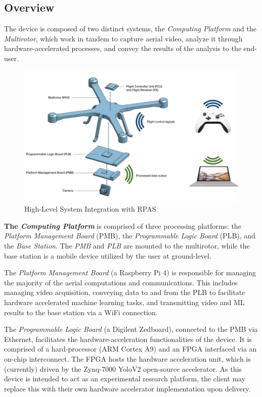 \subsection{Overview}
The device is composed of two distinct systems, the \textit{Computing Platform} and the \textit{Multirotor}, which work in tandem to capture aerial video, analyze it through hardware-accelerated processes, and convey the results of the analysis to the end-user. 

\begin{figure}[H]\label{hlpic}
    \centering
    \includegraphics[width=\linewidth]{img/intpic.png}
\caption{High-Level System Integration with RPAS}
\end{figure}

\textbf{The \textit{Computing Platform}} is comprised of three processing platforms: the \textit{Platform Management Board} (PMB), the \textit{Programmable Logic Board} (PLB), and the \textit{Base Station}. The \textit{PMB} and \textit{PLB} are mounted to the multirotor, while the base station is a mobile device utilized by the user at ground-level.

The \textit{Platform Management Board} (a Raspberry Pi 4) is responsible for managing the majority of the aerial computations and communications. This includes managing video acquisition, conveying data to and from the PLB to facilitate hardware accelerated machine learning tasks, and transmitting video and ML results to the base station via a WiFi connection.

The \textit{Programmable Logic Board} (a Digilent Zedboard), connected to the PMB via Ethernet, facilitates the hardware-acceleration functionalities of the device. It is comprised of a hard-processor (ARM Cortex A9) and an FPGA interfaced via an on-chip interconnect. The FPGA hosts the hardware acceleration unit, which is (currently) driven by the Zynq-7000 YoloV2 open-source accelerator\cite{yolov2accel}. As this device is intended to act as an experimental research platform, the client may replace this with their own hardware accelerator implementation upon delivery.

